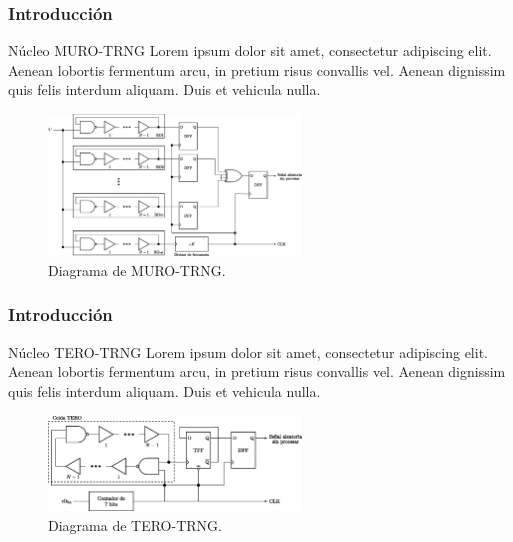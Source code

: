 \documentclass[10pt]{beamer}
\begin{document}
\begin{frame}
    \frametitle{Introducción}
    \begin{block}{Núcleo MURO-TRNG}
        \justifying
         Lorem ipsum dolor sit amet, consectetur adipiscing elit. Aenean lobortis fermentum arcu, in pretium risus convallis vel. Aenean dignissim quis felis interdum aliquam. Duis et vehicula nulla.   
	\end{block}
	\begin{figure}[hbtp]
	    \centering
	    \includegraphics[width=0.6\textwidth]{A3_MURO_TRNG}
	    \caption{Diagrama de MURO-TRNG.}
        \label{fig:A3_MURO_TRNG}
    \end{figure}
\end{frame}


\begin{frame}
    \frametitle{Introducción}
    \begin{block}{Núcleo TERO-TRNG}
        \justifying
         Lorem ipsum dolor sit amet, consectetur adipiscing elit. Aenean lobortis fermentum arcu, in pretium risus convallis vel. Aenean dignissim quis felis interdum aliquam. Duis et vehicula nulla.   
	\end{block}
	\begin{figure}[hbtp]
	    \centering
	    \includegraphics[width=0.6\textwidth]{A4_TERO_TRNG}
	    \caption{Diagrama de TERO-TRNG.}
        \label{fig:A4_TERO_TRNG}
    \end{figure}
\end{frame}
\end{document}
